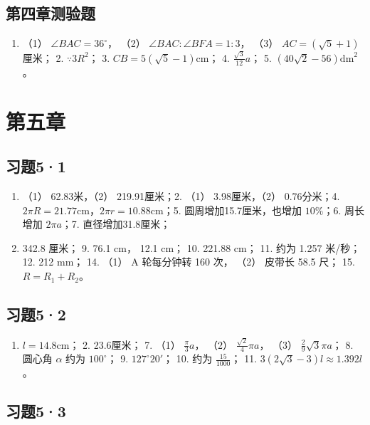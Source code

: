\subsection{第四章测验题}

\begin{enumerate}
\item
  （1） \(\angle BAC = 36^{\circ}\)， （2）
  \(\angle BAC: \angle BFA = 1:3\)， （3） \(AC = (\sqrt{5} + 1)\)
  厘米； 2. \(\because 3R^{2}\)； 3.
  \(CB = 5(\sqrt{5} - 1)\mathrm{cm}\)； 4. \(\frac{\sqrt{3}}{12}a\)； 5.
  \((40\sqrt{2} - 56)\mathrm{dm}^{2}\)。
\end{enumerate}

\section{第五章}

\subsection{习题5·1}

\begin{enumerate}
\item
  （1） 62.83米，（2） 219.91厘米；2. （1） 3.98厘米，（2） 0.76分米；4.
  \(2\pi R = 21.77\mathrm{cm}\)，\(2\pi r = 10.88\mathrm{cm}\)；5.
  圆周增加15.7厘米，也增加 \(10\%\)；6. 周长增加 \(2\pi a\)；7.
  直径增加31.8厘米；
\item
  342.8 厘米； 9. 76.1 cm， 12.1 cm； 10. 221.88 cm； 11. 约为 1.257
  米/秒； 12. 212 mm； 14. （1） A 轮每分钟转 160 次， （2） 皮带长 58.5
  尺； 15. \(R = R_{1} + R_{2}\)。
\end{enumerate}

\subsection{习题5·2}

\begin{enumerate}
\item
  \(l = 14.8\mathrm{cm}\)； 2. 23.6厘米； 7. （1） \(\frac{\pi}{3} a\)，
  （2） \(\frac{\sqrt{2}}{4}\pi a\)， （3）
  \(\frac{2}{9}\sqrt{3}\pi a\)； 8. 圆心角 \(\alpha\) 约为
  \(100^{\circ}\)； 9. \(127^{\circ}20'\)； 10. 约为
  \(\frac{15}{1000}\)； 11. \(3(2\sqrt{3} - 3)l \approx 1.392l\)。
\end{enumerate}

\subsection{习题5·3}

